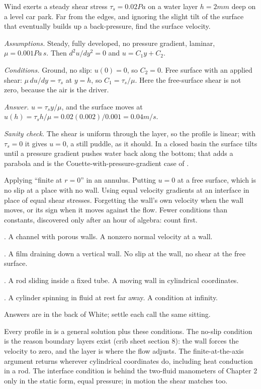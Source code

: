 \begin{example}
Wind exerts a steady shear stress $\tau_s = 0.02\unit{Pa}$ on a water layer $h = 2\unit{mm}$ deep on a level car park. Far from the edges, and ignoring the slight tilt of the surface that eventually builds up a back-pressure, find the surface velocity.

\emph{Assumptions.} Steady, fully developed, no pressure gradient, laminar, $\mu = 0.001\unit{Pa\,s}$. Then $d^2u/dy^2 = 0$ and $u = C_1y + C_2$.

\emph{Conditions.} Ground, no slip: $u(0) = 0$, so $C_2 = 0$. Free surface with an applied shear: $\mu\,du/dy = \tau_s$ at $y = h$, so $C_1 = \tau_s/\mu$. Here the free-surface shear is not zero, because the air is the driver.

\emph{Answer.} $u = \tau_s y/\mu$, and the surface moves at $u(h) = \tau_s h/\mu = 0.02(0.002)/0.001 = 0.04\unit{m/s}$.

\emph{Sanity check.} The shear is uniform through the layer, so the profile is linear; with $\tau_s = 0$ it gives $u = 0$, a still puddle, as it should. In a closed basin the surface tilts until a pressure gradient pushes water back along the bottom; that adds a parabola and is the Couette-with-pressure-gradient case of .
\end{example}

\begin{trap}
Applying ``finite at $r = 0$'' in an annulus. Putting $u = 0$ at a free surface, which is no slip at a place with no wall. Using equal velocity gradients at an interface in place of equal shear stresses. Forgetting the wall's own velocity when the wall moves, or its sign when it moves against the flow. Fewer conditions than constants, discovered only after an hour of algebra: count first.
\end{trap}

\begin{ladder}
\item {}. A channel with porous walls. A nonzero normal velocity at a wall.
\item {}. A film draining down a vertical wall. No slip at the wall, no shear at the free surface.
\item {}. A rod sliding inside a fixed tube. A moving wall in cylindrical coordinates.
\item {}. A cylinder spinning in fluid at rest far away. A condition at infinity.
\end{ladder}
Answers are in the back of White; settle each call the same sitting.


\begin{hides}
Every profile in  is a general solution plus these conditions. The no-slip condition is the reason boundary layers exist (crib sheet section 8): the wall forces the velocity to zero, and the layer is where the flow adjusts. The finite-at-the-axis argument returns wherever cylindrical coordinates do, including heat conduction in a rod. The interface condition is behind the two-fluid manometers of Chapter 2 only in the static form, equal pressure; in motion the shear matches too.
\end{hides}
